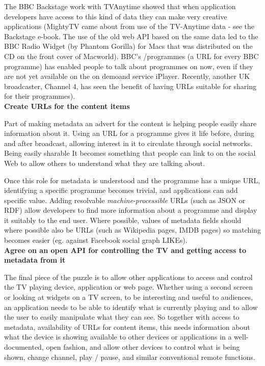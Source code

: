 \documentclass[]{article}%
\begin{document}
The BBC Backstage work with TVAnytime showed that when application developers have access to this kind of data they can make very creative applications (MightyTV came about from use of the TV-Anytime data - see the Backstage e-book.  The use of the old web API based on the same data led to the BBC Radio Widget (by Phantom Gorilla) for Macs that was distributed on the CD on the front cover of Macworld). BBC's /programmes (a URL for every BBC programme) has enabled people to talk about programmes on now, even if they are not yet available on the on demoand service iPlayer. Recently, another UK broadcaster, Channel 4, has seen the benefit of having URLs suitable for sharing for their programmes).
\\

{\bf{Create URLs for the content items}}

Part of making metadata an advert for the content is helping people easily share information about it. Using an URL for a programme gives it life before, during and after broadcast, allowing interest in it to circulate through social networks. Being easily sharable It becomes something that people can link to on the social Web to allow others to understand what they are talking about. 

Once this role for metadata is understood and the programme has a unique URL, identifying a specific programme becomes trivial, and applications can add specific value. Adding resolvable {\em{machine-processible}} URLs (such as JSON or RDF) allow developers to find more information about a programme and display it suitably to the end user. Where possible, values of metadata fields should where possible also be URLs (such as Wikipedia pages, IMDB pages) so matching becomes easier (eg. against Facebook social graph LIKEs).
\\

{\bf{Agree on an open API for controlling the TV and getting access to metadata from it}}

The final piece of the puzzle is to allow other applications to access and control the TV playing device, application or web page. Whether using a second screen or looking at widgets on a TV screen, to be interesting and useful to audiences, an application needs to be able to identify what is currently playing and to allow the user to easily manipulate what they can see. So together with access to metadata, availability of URLs for content items, this needs information about what the device is showing available to other devices or applications in a well-documented, open fashion, and allow other devices to control what is being shown, change channel, play / pause, and similar conventional remote functions.
\end{document}
